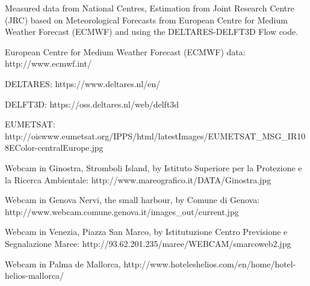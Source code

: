 \documentclass[a4paper]{article}
\renewcommand{\\}{\ {\large\textperiodcentered}\ }
\renewcommand{\\}{\ {\large\textperiodcentered}\ }
\begin{document}
Measured data from National Centres, Estimation from Joint Research Centre (JRC) based on Meteorological Forecasts from European Centre for Medium Weather Forecast (ECMWF) and using the DELTARES-DELFT3D Flow code.

European Centre for Medium Weather Forecast (ECMWF) data: http://www.ecmwf.int/

DELTARES: https://www.deltares.nl/en/

DELFT3D: https://oss.deltares.nl/web/delft3d

EUMETSAT: http://oiswww.eumetsat.org/IPPS/html/latestImages/EUMETSAT\_MSG\_IR108EColor-centralEurope.jpg

Webcam in Ginostra, Stromboli Island, by Istituto Superiore per la Protezione e la Ricerca Ambientale: http://www.mareografico.it/DATA/Ginostra.jpg

Webcam in Genova Nervi, the small harbour, by Comune di Genova: http://www.webcam.comune.genova.it/images\_out/current.jpg

Webcam in Venezia, Piazza San Marco, by Istitutuzione Centro Previsione e Segnalazione Maree: http://93.62.201.235/maree/WEBCAM/smarcoweb2.jpg

Webcam in Palma de Mallorca, http://www.hoteleshelios.com/en/home/hotel-helios-mallorca/
\end{document}
